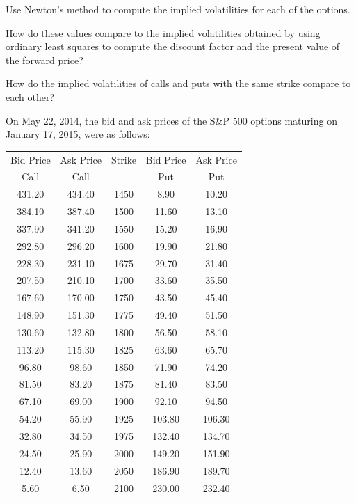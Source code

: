 \begin{exercises}
\begin{subparts}
\item Use Newton's method to compute the implied volatilities for each of the options.
\item How do these values compare to the implied volatilities obtained by using
ordinary least squares to compute the discount factor and the present value of the
forward price?
\item How do the implied volatilities of calls and puts with the same strike compare to
each other?
\end{subparts}

\item On May 22, 2014, the bid and ask prices of the S\&P 500 options maturing on
January 17, 2015, were as follows:
\begin{center}
\begin{tabular}{ccccc}
Bid Price & Ask Price & Strike & Bid Price & Ask Price \\
Call & Call & & Put & Put \\[0.4em]
431.20 & 434.40 & 1450 & 8.90 & 10.20 \\
384.10 & 387.40 & 1500 & 11.60 & 13.10 \\
337.90 & 341.20 & 1550 & 15.20 & 16.90 \\
292.80 & 296.20 & 1600 & 19.90 & 21.80 \\
228.30 & 231.10 & 1675 & 29.70 & 31.40 \\
207.50 & 210.10 & 1700 & 33.60 & 35.50 \\
167.60 & 170.00 & 1750 & 43.50 & 45.40 \\
148.90 & 151.30 & 1775 & 49.40 & 51.50 \\
130.60 & 132.80 & 1800 & 56.50 & 58.10 \\
113.20 & 115.30 & 1825 & 63.60 & 65.70 \\
96.80 & 98.60 & 1850 & 71.90 & 74.20 \\
81.50 & 83.20 & 1875 & 81.40 & 83.50 \\
67.10 & 69.00 & 1900 & 92.10 & 94.50 \\
54.20 & 55.90 & 1925 & 103.80 & 106.30 \\
32.80 & 34.50 & 1975 & 132.40 & 134.70 \\
24.50 & 25.90 & 2000 & 149.20 & 151.90 \\
12.40 & 13.60 & 2050 & 186.90 & 189.70 \\
5.60 & 6.50 & 2100 & 230.00 & 232.40
\end{tabular}
\end{center}


\end{exercises}
